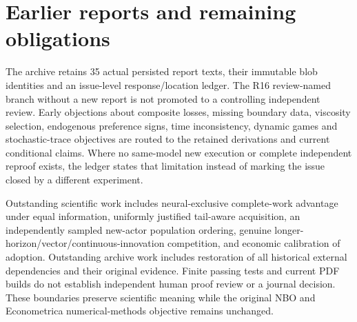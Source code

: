\documentclass[11pt]{article}
\begin{document}
\section*{Earlier reports and remaining obligations}
The archive retains 35 actual persisted report texts, their immutable blob identities and an issue-level response/location ledger. The R16 review-named branch without a new report is not promoted to a controlling independent review. Early objections about composite losses, missing boundary data, viscosity selection, endogenous preference signs, time inconsistency, dynamic games and stochastic-trace objectives are routed to the retained derivations and current conditional claims. Where no same-model new execution or complete independent reproof exists, the ledger states that limitation instead of marking the issue closed by a different experiment.

Outstanding scientific work includes neural-exclusive complete-work advantage under equal information, uniformly justified tail-aware acquisition, an independently sampled new-actor population ordering, genuine longer-horizon/vector/continuous-innovation competition, and economic calibration of adoption. Outstanding archive work includes restoration of all historical external dependencies and their original evidence. Finite passing tests and current PDF builds do not establish independent human proof review or a journal decision. These boundaries preserve scientific meaning while the original NBO and Econometrica numerical-methods objective remains unchanged.
\end{document}
